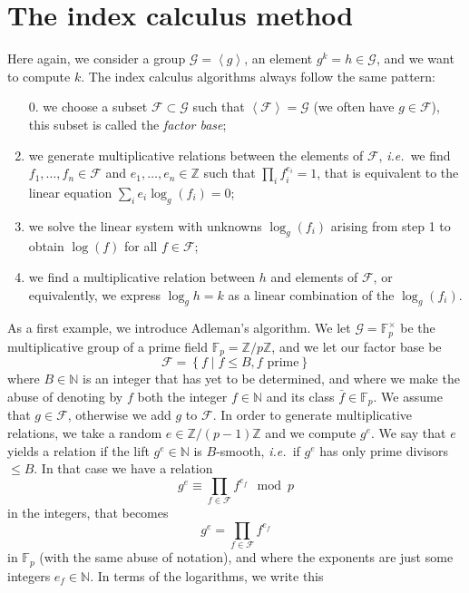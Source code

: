 \documentclass[a4paper,11pt]{article}
\theoremstyle{break}
\theoremstyle{sc}
\theoremstyle{definition}
\theoremstyle{remark}
\newcommand{\ie}{\emph{i.e.\ }}
\begin{document}
\section{The index calculus method}
\label{index-calculus}

Here again, we consider a group $\mathcal G=\left\langle g \right\rangle$, an element
$g^k = h\in \mathcal G$, and we want to compute $k$. The index calculus algorithms always
follow the same pattern:
\begin{enumerate}
  \item[0.] we choose a subset $\mathcal F\subset \mathcal G$ such that $\left\langle
    \mathcal F \right\rangle = \mathcal G$
    (we often have $g\in \mathcal F$), this subset is called the \emph{factor base};
  \item we generate multiplicative relations between the elements of $\mathcal F$, \ie we
    find $f_1, \dots, f_n \in \mathcal F$ and $e_1, \dots, e_n\in \mathbb{Z}$ such that
    $\prod_i f_i^{e_i} = 1$, that is equivalent to the linear equation $\sum_i
    e_i\log_g(f_i) = 0$;
  \item we solve the linear system with unknowns $\log_g(f_i)$ arising from step
    1 to obtain $\log(f)$ for all $f\in \mathcal F$;
  \item we find a multiplicative relation between $h$ and elements of $\mathcal F$, or
    equivalently, we express $\log_g h = k$ as a linear combination of the
  $\log_g(f_i)$.
\end{enumerate}
As a first example, we introduce Adleman's algorithm. We let $\mathcal
G=\mathbb{F}_p^\times$ be the multiplicative group of a prime field
$\mathbb{F}_p=\mathbb{Z}/p\mathbb{Z}$, and we let our factor base be 
\[
  \mathcal F =\left\{ f\;|\;f\leq B, f\text{ prime} \right\}
\]
where $B\in \mathbb{N}$ is an integer that has yet to be determined, and where
we make the abuse of denoting by $f$ both the integer
$f\in\mathbb{N}$ and its class $\bar f\in\mathbb{F}_p$. We assume that
$g\in\mathcal F$, otherwise we add $g$ to $\mathcal F$. In order to generate
multiplicative relations, we take a random $e\in\mathbb{Z}/(p-1)\mathbb{Z}$ and
we compute $g^e$. We say that $e$ yields a relation if the lift
$g^e\in\mathbb{N}$ is $B$-smooth, \ie if $g^e$ has only prime divisors $\leq B$.
In that case we have a relation 
\[ 
  g^e \equiv \prod_{f\in \mathcal F}f^{e_f} \mod p
\]
in the integers, that becomes 
\[ 
  g^e = \prod_{f\in \mathcal F}f^{e_f}
\]
in $\mathbb{F}_p$ (with the same abuse of notation), and where the exponents are
just some integers $e_f\in\mathbb{N}$. In terms of the logarithms, we write this
\end{document}
